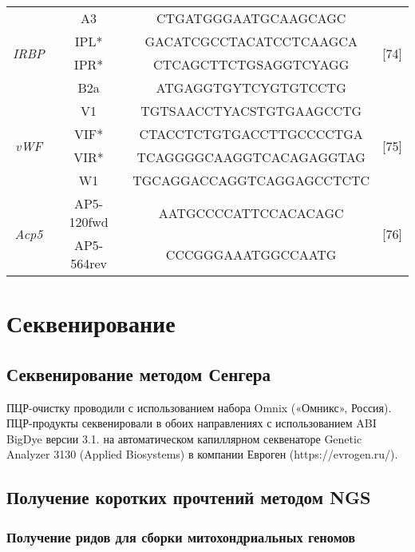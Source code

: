 \begin{table}[h!]
\begin{center}
\begin{tabular}{|c|c|c|c|}
\multirow{4}{*}{\textit{IRBP}}	& A3  & CTGATGGGAATGCAAGCAGC & \multirow{4}{*}{[74]}\\ 
\cline{2-3} 
& IPL* & GACATCGCCTACATCCTCAAGCA & \\ \cline{2-3} 
& IPR* & CTCAGCTTCTGSAGGTCYAGG & \\ \cline{2-3} 
& B2a & ATGAGGTGYTCYGTGTCCTG & \\
\hline

\multirow{4}{*}{\textit{vWF}}	& V1 & TGTSAACCTYACSTGTGAAGCCTG & \multirow{4}{*}{[75]}\\ 
\cline{2-3} 
& VIF* & CTACCTCTGTGACCTTGCCCCTGA & \\ \cline{2-3} 
& VIR* & TCAGGGGCAAGGTCACAGAGGTAG & \\ \cline{2-3} 
& W1 & TGCAGGACCAGGTCAGGAGCCTCTC & \\
\hline

\multirow{2}{*}{\textit{Acp5}}	& AP5-120fwd  & AATGCCCCATTCCACACAGC & \multirow{2}{*}{[76]}\\ 
\cline{2-3} 
& AP5-564rev & CCCGGGAAATGGCCAATG & \\ 
\hline

\end{tabular} 

\end{center}

\end{table}

\section{Секвенирование}

\subsection{Секвенирование методом Сенгера}

ПЦР-очистку проводили с использованием набора Omnix («Омникс», Россия). ПЦР-продукты секвенировали в обоих направлениях с использованием ABI BigDye версии 3.1. на автоматическом капиллярном секвенаторе Genetic Analyzer 3130 (Applied Biosystems) в компании Евроген (https://evrogen.ru/).  

\subsection{Получение коротких прочтений методом NGS}

\subsubsection{Получение ридов для сборки митохондриальных геномов}

